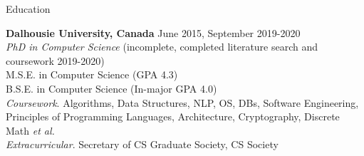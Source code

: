 \documentclass{resume} %
\begin{document}

\begin{rSection}{Education}

{\bf Dalhousie University, Canada} \hfill {June 2015, September 2019-2020} \\
\textit{PhD in Computer Science} (incomplete, completed literature search and coursework 2019-2020) \\
M.S.E. in Computer Science (GPA 4.3) \\
B.S.E. in Computer Science (In-major GPA 4.0) \smallskip \\
\textit{Coursework}. Algorithms, Data Structures, NLP, OS, DBs, Software Engineering, \\
Principles of Programming Languages, Architecture, Cryptography, Discrete Math \textit{et al.} \smallskip \\
\textit{Extracurricular}. Secretary of CS Graduate Society, CS Society

\end{rSection}

\end{document}
